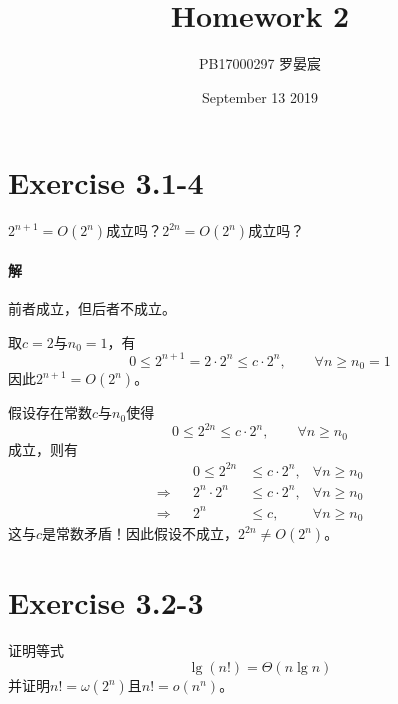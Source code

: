 \documentclass{article}
\title{Homework 2}
\author{PB17000297 罗晏宸}
\date{September 13 2019}
\begin{document}
\maketitle

\section{Exercise 3.1-4}
$2^{n+1}=O(2^n)$成立吗？$2^{2n}=O(2^n)$成立吗？
\\

\paragraph{解}
前者成立，但后者不成立。\par
取$c=2$与$n_0=1$，有
\begin{equation*}
    0 \leq 2^{n+1} = 2 \cdot 2^n \leq c \cdot 2^n, \qquad \forall n \geq n_0 = 1
\end{equation*}
因此$2^{n+1}=O(2^n)$。\par
假设存在常数$c$与$n_0$使得
\begin{equation*}
    0 \leq 2^{2n} \leq c \cdot 2^n, \qquad \forall n \geq n_0
\end{equation*}
成立，则有
\begin{align*}
    && 0 \leq 2^{2n} &\leq c \cdot 2^n, & \forall n \geq n_0 \\
    \Rightarrow && 2^n \cdot 2^n &\leq c \cdot 2^n, &  \forall n \geq n_0 \\
    \Rightarrow && 2^n &\leq c, & \forall n \geq n_0
\end{align*}
这与$c$是常数矛盾！因此假设不成立，$2^{2n} \neq O(2^n)$。
\\

\section{Exercise 3.2-3}
证明等式
\begin{equation}
    \lg{(n!)}=\Theta(n \lg{n}) \tag{3.19}
\end{equation}
并证明$n!=\omega (2^n)$且$n!=o(n^n)$。
\\
\end{document}
